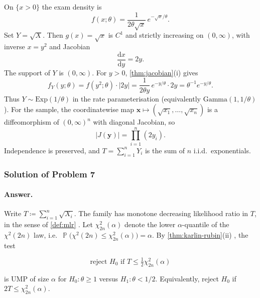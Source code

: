 \documentclass[11pt,a4paper]{article}
\DeclareMathOperator{\Pbb}{\mathbb{P}}
\begin{document}
\begin{example}
\label{ex:sqrt-jacobian}
On \(\{x>0\}\) the exam density is
\[
f(x;\theta)
=
\frac{1}{2\theta\sqrt{x}}\,e^{-\sqrt{x}/\theta}.
\]
Set \(Y=\sqrt{X}\). Then \(g(x)=\sqrt{x}\) is \(C^{1}\) and strictly increasing on \((0,\infty)\), with inverse \(x=y^{2}\) and Jacobian
\[
\frac{\mathrm{d}x}{\mathrm{d}y}
=
2y.
\]
The support of \(Y\) is \((0,\infty)\). For \(y>0\), \cref{thm:jacobian}(i) gives
\[
f_Y(y;\theta)
=
f(y^{2};\theta)\cdot |2y|
=
\frac{1}{2\theta y}\,e^{-y/\theta}\cdot 2y
=
\theta^{-1}e^{-y/\theta}.
\]
Thus \(Y\sim\mathrm{Exp}(1/\theta)\) in the rate parameterisation (equivalently \(\mathrm{Gamma}(1,1/\theta)\)). For the sample, the coordinatewise map \(\mathbf{x}\mapsto(\sqrt{x_1},\dots,\sqrt{x_n})\) is a diffeomorphism of \((0,\infty)^n\) with diagonal Jacobian, so
\[
|J(\mathbf{y})|
=
\prod_{i=1}^{n}(2y_i).
\]
Independence is preserved, and \(T=\sum_{i=1}^{n}Y_i\) is the sum of \(n\) i.i.d.\ exponentials.
\end{example}

\subsubsection{Solution of Problem 7}

\paragraph{Answer.}

Write \(T\coloneqq\sum_{i=1}^{n}\sqrt{X_i}\). The family has monotone decreasing likelihood ratio in \(T\), in the sense of \cref{def:mlr} \citep[Definition~8.2.2]{hogg2019}. Let \(\chi^{2}_{2n}(\alpha)\) denote the lower \(\alpha\)-quantile of the \(\chi^{2}(2n)\) law, i.e.\ \(\Pbb\bigl(\chi^{2}(2n)\le\chi^{2}_{2n}(\alpha)\bigr)=\alpha\). By \cref{thm:karlin-rubin}(ii) \citep[(8.2.6)]{hogg2019}, the test

\[
\text{reject }H_0\text{ if }T\le\tfrac12\chi^{2}_{2n}(\alpha)
\]

is UMP of size \(\alpha\) for \(H_0:\theta\ge 1\) versus \(H_1:\theta<1/2\). Equivalently, reject \(H_0\) if \(2T\le\chi^{2}_{2n}(\alpha)\).
\end{document}
